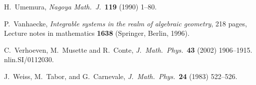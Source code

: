 \documentclass[10pt]{article}
\begin{document}
\begin{thebibliography}{99}
 H.~Umemura,
{\it Nagoya Math.~J.}~{\bf 119} (1990) 1--80.

 P.~Vanhaecke,
{\it Integrable systems in the realm of algebraic geometry},
218 pages, Lecture notes in mathematics {\bf 1638}
(Springer, Berlin, 1996).

 C.~Verhoeven, M.~Musette and R.~Conte,
{\it J.~Math.~Phys.}~{\bf 43} (2002) 1906--1915.  nlin.SI/0112030.

 J.~Weiss, M.~Tabor, and G.~Carnevale,
{\it J.~Math.~Phys.}~{\bf 24} (1983) 522--526.

\end{thebibliography}

\vfill \eject
\end{document}
